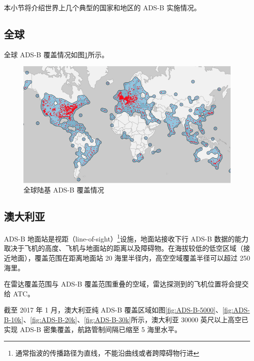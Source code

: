 本小节将介绍世界上几个典型的国家和地区的 ADS-B 实施情况。

\subsection{全球}

全球 ADS-B 覆盖情况如图\ref{fig:1ADS-B-coverage}所示。

\begin{figure}[!htb]
\centering
\includegraphics[width=14cm]{pic/1ADS-B-coverage.png}
\caption{全球陆基 ADS-B 覆盖情况\protect\footnotemark}
\label{fig:1ADS-B-coverage}
\end{figure}


\subsection{澳大利亚}

ADS-B 地面站是视距（line-of-sight）\footnote{通常指波的传播路径为直线，不能沿曲线或者跨障碍物行进}设施，地面站接收下行 ADS-B 数据的能力取决于飞机的高度、飞机与地面站的距离以及障碍物。在海拔较低的低空区域（接近地面），覆盖范围在距离地面站 20 海里半径内，高空空域覆盖半径可以超过 250 海里。

在雷达覆盖范围与 ADS-B 覆盖范围重叠的空域，雷达探测到的飞机位置将会提交给 ATC。

截至 2017 年 1 月，澳大利亚纯 ADS-B 覆盖区域如图\ref{fig:ADS-B-5000}、\ref{fig:ADS-B-10k}、\ref{fig:ADS-B-20k}、\ref{fig:ADS-B-30k}所示，澳大利亚 30000 英尺以上高空已实现 ADS-B 密集覆盖，航路管制间隔已缩至 5 海里水平。


